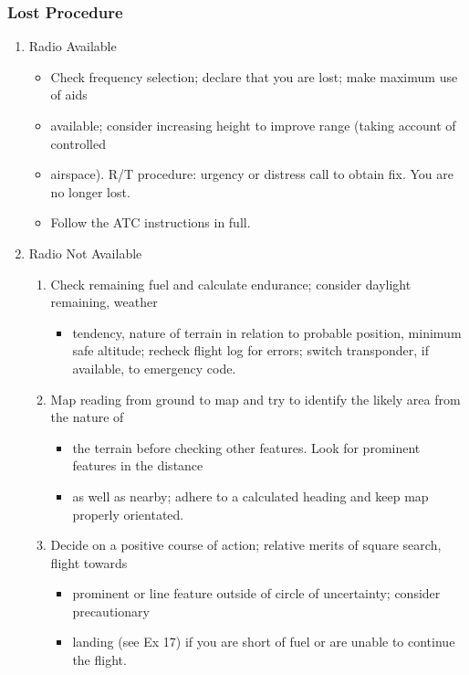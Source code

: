\documentclass[a4paper]{article}
\newenvironment{checklist}{
  \begin{itemize}[leftmargin=*, align=left]
    \setlength{\itemsep}{2pt}
    \setlength{\parskip}{0pt}
    \setlength{\parsep}{0pt}
}{
  \end{itemize}
}
\begin{document}
\subsubsection*{Lost Procedure}
\begin{enumerate}[label=\alph*)]
\item Radio Available
  \begin{checklist}
  \item Check frequency selection; declare that you are lost; make maximum use of aids
  \item available; consider increasing height to improve range (taking account of controlled
  \item airspace). R/T procedure: urgency or distress call to obtain fix. You are no longer lost.
  \item Follow the ATC instructions in full.
  \end{checklist}
\item Radio Not Available
  \begin{enumerate}[label=\roman*.]
  \item Check remaining fuel and calculate endurance; consider daylight remaining, weather
    \begin{checklist}
    \item tendency, nature of terrain in relation to probable position, minimum safe altitude; recheck flight log for errors; switch transponder, if available, to emergency code.
    \end{checklist}
  \item Map reading from ground to map and try to identify the likely area from the nature of
    \begin{checklist}
    \item the terrain before checking other features. Look for prominent features in the distance
    \item as well as nearby; adhere to a calculated heading and keep map properly orientated.
    \end{checklist}
  \item Decide on a positive course of action; relative merits of square search, flight towards
    \begin{checklist}
    \item prominent or line feature outside of circle of uncertainty; consider precautionary
    \item landing (see Ex 17) if you are short of fuel or are unable to continue the flight.
    \end{checklist}
  \end{enumerate}
\end{enumerate}
\end{document}
